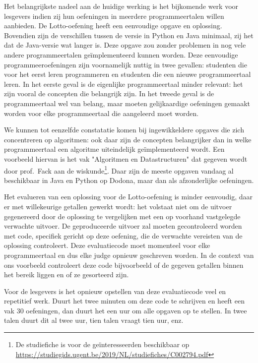Het belangrijkste nadeel aan de huidige werking is het bijkomende werk voor lesgevers indien zij hun oefeningen in meerdere programmeertalen willen aanbieden.
De Lotto-oefening heeft een eenvoudige opgave en oplossing.
Bovendien zijn de verschillen tussen de versie in Python en Java minimaal, zij het dat de Java-versie wat langer is.
Deze opgave zou zonder problemen in nog vele andere programmeertalen geïmplementeerd kunnen worden.
Deze eenvoudige programmeeroefeningen zijn voornamelijk nuttig in twee gevallen: studenten die voor het eerst leren programmeren en studenten die een nieuwe programmeertaal leren.
In het eerste geval is de eigenlijke programmeertaal minder relevant: het zijn vooral de concepten die belangrijk zijn.
In het tweede geval is de programmeertaal wel van belang, maar moeten gelijkaardige oefeningen gemaakt worden voor elke programmeertaal die aangeleerd moet worden.

We kunnen tot eenzelfde constatatie komen bij ingewikkeldere opgaves die zich concentreren op algoritmen: ook daar zijn de concepten belangrijker dan in welke programmeertaal een algoritme uiteindelijk geïmplementeerd wordt.
Een voorbeeld hiervan is het vak "Algoritmen en Datastructuren" dat gegeven wordt door prof.\ Fack aan de wiskunde\footnote{De studiefiche is voor de geïnteresseerden beschikbaar op \url{https://studiegids.ugent.be/2019/NL/studiefiches/C002794.pdf}}.
Daar zijn de meeste opgaven vandaag al beschikbaar in Java en Python op Dodona, maar dan als afzonderlijke oefeningen.

Het evalueren van een oplossing voor de Lotto-oefening is minder eenvoudig, daar er met willekeurige getallen gewerkt wordt: het volstaat niet om de uitvoer gegenereerd door de oplossing te vergelijken met een op voorhand vastgelegde verwachte uitvoer.
De geproduceerde uitvoer zal moeten gecontroleerd worden met code, specifiek gericht op deze oefening, die de verwachte vereisten van de oplossing controleert.
Deze evaluatiecode moet momenteel voor elke programmeertaal en dus elke judge opnieuw geschreven worden.
In de context van ons voorbeeld controleert deze code bijvoorbeeld of de gegeven getallen binnen het bereik liggen en of ze gesorteerd zijn.

Voor de lesgevers is het opnieuw opstellen van deze evaluatiecode veel en repetitief werk.
Duurt het twee minuten om deze code te schrijven en heeft een vak 30 oefeningen, dan duurt het een uur om alle opgaven op te stellen.
In twee talen duurt dit al twee uur, tien talen vraagt tien uur, enz.

